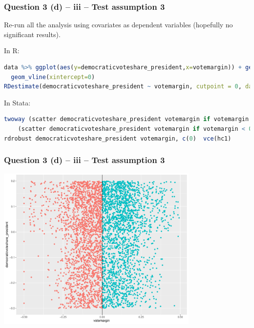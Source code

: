 \documentclass[xcolor=table,dvipsnames]{beamer}
\begin{document}
\begin{frame}[fragile]
\frametitle{Question 3 (d) -- iii -- Test assumption 3} \pause
Re-run all the analysis using covariates as dependent variables (hopefully no significant results). \pause

In R: 
\begin{lstlisting}[language=R]
data %>% ggplot(aes(y=democraticvoteshare_president,x=votemargin)) + geom_point(aes(col = indicator)) +
  geom_vline(xintercept=0)
RDestimate(democraticvoteshare_president ~ votemargin, cutpoint = 0, data = data, se.type = "HC1")
\end{lstlisting} \pause

In Stata:
\begin{lstlisting}[language=R]
twoway (scatter democraticvoteshare_president votemargin if votemargin >= 0) ///
	(scatter democraticvoteshare_president votemargin if votemargin < 0), xline(0) leg(off)
rdrobust democraticvoteshare_president votemargin, c(0)  vce(hc1)
\end{lstlisting}
\end{frame}

\begin{frame}
\frametitle{Question 3 (d) -- iii -- Test assumption 3}
\centering
\includegraphics[width=100mm]{pictures/week_22_ass3.pdf} 
\end{frame}
\end{document}
